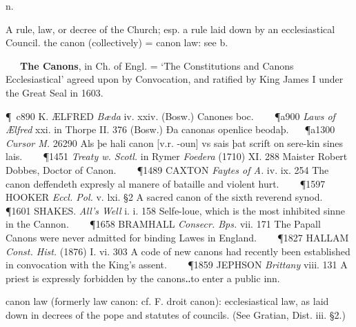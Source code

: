 \begin{description}[wide, labelwidth=!, labelindent=0pt]
 n.

\noindent {}

\vspace{-0.3cm}

\begin{myenumerate}

 A rule, law, or decree of the Church; esp. a rule laid down by an ecclesiastical Council. the canon (collectively) = canon law: see b.

   \textbf{The Canons}, in Ch. of Engl. = ‘The Constitutions and Canons Ecclesiastical’ agreed upon by Convocation, and ratified by King James I under the Great Seal in 1603.

\P c890 K. ÆLFRED \textit{Bæda} iv. xxiv. (Bosw.) Canones boc.    
\P a900 \textit{Laws of Ælfred} xxi. in Thorpe II. 376 (Bosw.) Ða canonas openlice beodaþ.   
\P a1300  \textit{Cursor M.} 26290 Als þe hali canon [v.r. -oun] vs sais þat scrift on sere-kin sines lais.    
\P 1451 \textit{Treaty  w. Scotl.} in Rymer \textit{Foedera} (1710) XI. 288 Maister Robert Dobbes, Doctor of Canon.    
\P 1489 CAXTON  \textit{Faytes of A.} iv. ix. 254 The canon deffendeth expresly al manere of bataille and violent hurt.    
\P 1597 HOOKER  \textit{Eccl. Pol.} v. lxi. §2 A sacred canon of the sixth reverend synod.    
\P 1601 SHAKES.  \textit{All's Well} i. i. 158 Selfe-loue, which is the most inhibited sinne in the Cannon.    
\P 1658 BRAMHALL  \textit{Consecr. Bps.} vii. 171 The Papall Canons were never admitted for binding Lawes in England.    
\P 1827 HALLAM  \textit{Const. Hist.} (1876) I. vi. 303 A code of new canons had recently been established in convocation with the King's assent.    
\P 1859 JEPHSON  \textit{Brittany} viii. 131 A priest is expressly forbidden by the canons‥to enter a public inn.

 canon law (formerly law canon: cf. F. droit canon): ecclesiastical law, as laid down in decrees of the pope and statutes of councils. (See Gratian, Dist. iii. §2.)


\end{myenumerate}
\end{description}
